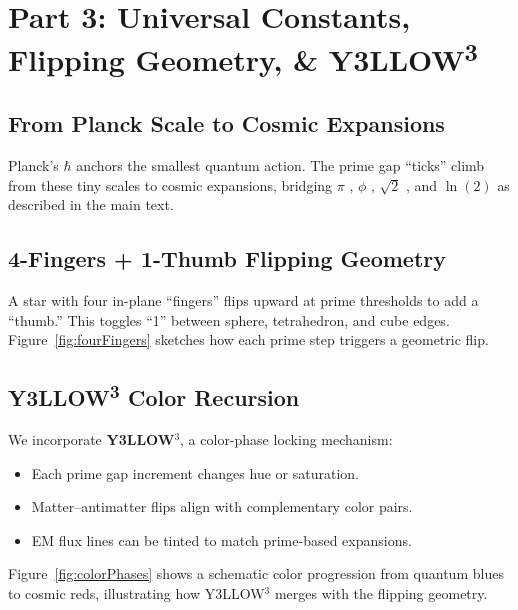 \documentclass[11pt]{article}
\begin{document}
\clearpage

\section{Part 3: Universal Constants, Flipping Geometry, \& Y3LLOW\textsuperscript{3}}
\label{part3}

\subsection{From Planck Scale to Cosmic Expansions}
Planck’s \(\hbar\) \cite{Planck1900} anchors the smallest quantum action. The prime gap “ticks” climb from these tiny scales to cosmic expansions, bridging \(\pi\) \cite{Archimedes287BC}, \(\phi\) \cite{Fibonacci1202}, \(\sqrt{2}\) \cite{Pythagoras500BC}, and \(\ln(2)\) \cite{Euler1736} as described in the main text.

\subsection{4-Fingers + 1-Thumb Flipping Geometry}
A star with four in-plane “fingers” flips upward at prime thresholds to add a “thumb.” This toggles “1” between sphere, tetrahedron, and cube edges. Figure~\ref{fig:fourFingers} sketches how each prime step triggers a geometric flip.

\subsection{Y3LLOW\textsuperscript{3} Color Recursion}
We incorporate \textbf{Y3LLOW$^3$}, a color-phase locking mechanism:
\begin{itemize}
    \item Each prime gap increment changes hue or saturation.
    \item Matter–antimatter flips align with complementary color pairs.
    \item EM flux lines can be tinted to match prime-based expansions.
\end{itemize}
Figure~\ref{fig:colorPhases} shows a schematic color progression from quantum blues to cosmic reds, illustrating how Y3LLOW$^3$ merges with the flipping geometry.

\clearpage

\end{document}
